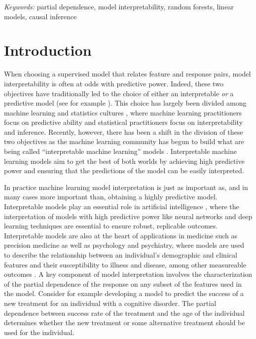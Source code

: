 \documentclass[12pt]{article}
\begin{document}
\noindent%
{\it Keywords:} partial dependence, model interpretability, random forests, linear models, causal inference

\section{Introduction}
\label{sec:intro}

When choosing a supervised model that relates feature and response pairs, model interpretability is often at odds with predictive power. Indeed, these two objectives have traditionally led to the choice of either an interpretable \emph{or} a predictive model (see for example \cite{shmueli2010explain}). This choice has largely been divided among machine learning and statistics cultures \citep{breiman2001statistical, donoho201750}, where machine learning practitioners focus on predictive ability and statistical practitioners focus on interpretability and inference. Recently, however, there has been a shift in the division of these two objectives as the machine learning community has begun to build what are being called  ``interpretable machine learning'' models \citep{doshi2017towards, vellido2012making}. Interpretable machine learning models aim to get the best of both worlds by achieving high predictive power and ensuring that the predictions of the model can be easily interpreted. 

In practice machine learning model interpretation is just as important as, and in many cases more important than, obtaining a highly predictive model. Interpretable models play an essential role in artificial intelligence \citep{adadi2018peeking}, where the interpretation of models with high predictive power like neural networks and deep learning techniques are essential to ensure robust, replicable outcomes. Interpretable models are also at the heart of applications in medicine such as precision medicine as well as psychology and psychiatry, where models are used to describe the relationship between an individual's demographic and clinical features and their susceptibility to illness and disease, among other measureable outcomes \citep{dwyer2018machine, katuwal2016machine}. A key component of model interpretation involves the characterization of the partial dependence of the response on any subset of the features used in the model. Consider for example developing a model to predict the success of a new treatment for an individual with a cognitive disorder. The partial dependence between success rate of the treatment and the age of the individual determines whether the new treatment or some alternative treatment should be used for the individual. 
\end{document}

